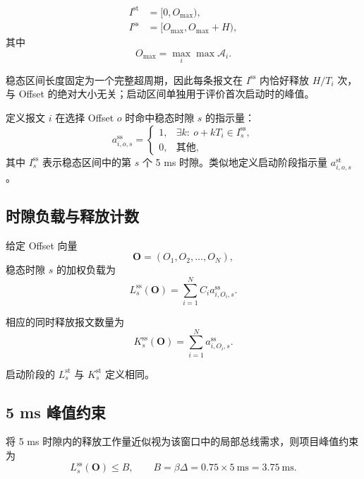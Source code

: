 \documentclass[UTF8,12pt,a4paper]{ctexart}
\newcommand{\Oset}{\mathcal{A}}
\begin{document}
\begin{align}
 I^{\mathrm{st}}&=[0,O_{\max}),\\
 I^{\mathrm{ss}}&=[O_{\max},O_{\max}+H),
\end{align}
其中
\begin{equation}
 O_{\max}=\max_i\max \Oset_i.
\end{equation}

稳态区间长度固定为一个完整超周期，因此每条报文在 $I^{\mathrm{ss}}$ 内恰好释放 $H/T_i$ 次，与 Offset 的绝对大小无关；启动区间单独用于评价首次启动时的峰值。

定义报文 $i$ 在选择 Offset $o$ 时命中稳态时隙 $s$ 的指示量：
\begin{equation}
 a^{\mathrm{ss}}_{i,o,s}=
 \begin{cases}
 1, & \exists k:\ o+kT_i\in I^{\mathrm{ss}}_s,\\
 0, & \text{其他},
 \end{cases}
\label{eq:indicator-ss}
\end{equation}
其中 $I^{\mathrm{ss}}_s$ 表示稳态区间中的第 $s$ 个 5 ms 时隙。类似地定义启动阶段指示量 $a^{\mathrm{st}}_{i,o,s}$。

\subsection{时隙负载与释放计数}

给定 Offset 向量
\begin{equation}
 \symbf{O}=(O_1,O_2,\ldots,O_N),
\end{equation}
稳态时隙 $s$ 的加权负载为
\begin{equation}
 L^{\mathrm{ss}}_s(\symbf{O})=
 \sum_{i=1}^{N} C_i a^{\mathrm{ss}}_{i,O_i,s}.
\label{eq:slot-load}
\end{equation}

相应的同时释放报文数量为
\begin{equation}
 K^{\mathrm{ss}}_s(\symbf{O})=
 \sum_{i=1}^{N} a^{\mathrm{ss}}_{i,O_i,s}.
\label{eq:slot-count}
\end{equation}

启动阶段的 $L^{\mathrm{st}}_s$ 与 $K^{\mathrm{st}}_s$ 定义相同。

\subsection{5 ms 峰值约束}

将 5 ms 时隙内的释放工作量近似视为该窗口中的局部总线需求，则项目峰值约束为
\begin{equation}
 L^{\mathrm{ss}}_s(\symbf{O})\le B,
 \qquad B=\beta\Delta=0.75\times 5\ \mathrm{ms}=3.75\ \mathrm{ms}.
\label{eq:hard-constraint}
\end{equation}
\end{document}
